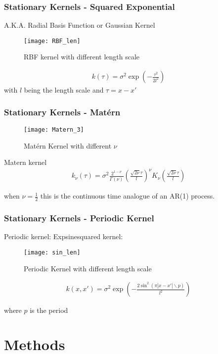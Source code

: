 \documentclass[
	8pt, %
]{beamer}
\begin{document}
\begin{frame}
	\frametitle{Stationary Kernels - Squared Exponential}

	A.K.A. Radial Basis Function or Gaussian Kernel

	\begin{figure}
			\texttt{[image: RBF\_len]}
			\caption{RBF kernel with different length scale}
	\end{figure}

	\begin{gather*}
    k(\tau) = \sigma^2 \exp(-\frac{\tau^2}{2 l^2})
	\end{gather*}
	with $l$ being the length scale and $\tau = x-x'$
\end{frame}

\begin{frame}
	\frametitle{Stationary Kernels - Matérn}


	\begin{figure}
			\texttt{[image: Matern\_3]}
			\caption{Matérn Kernel with different $\nu$}
	\end{figure}

	Matern kernel
	\begin{gather*}
    k_{\nu}(\tau) = \sigma^2 \frac{2^{1-\nu}}{\Gamma(\nu)}(\frac{\sqrt{2\nu} \tau}{l})^{\nu} K_{\nu}
    (\frac{\sqrt{2\nu} \tau}{l})
	\end{gather*}

	when $\nu = \frac{1}{2}$ this is the continuous time analogue of an AR(1) process.

\end{frame}

\begin{frame}
	\frametitle{Stationary Kernels - Periodic Kernel}
	Periodic kernel: Expsinesquared kernel:

	\begin{figure}
			\texttt{[image: sin\_len]}
			\caption{Periodic Kernel with different length scale}
	\end{figure}

	\begin{gather*}
    k(x, x') = \sigma^2 \exp(- \frac{2 \sin^2(\pi |x-x'| \backslash p)}{l^2})
	\end{gather*}

	where $p$ is the period
\end{frame}

\section{Methods}
\end{document}
